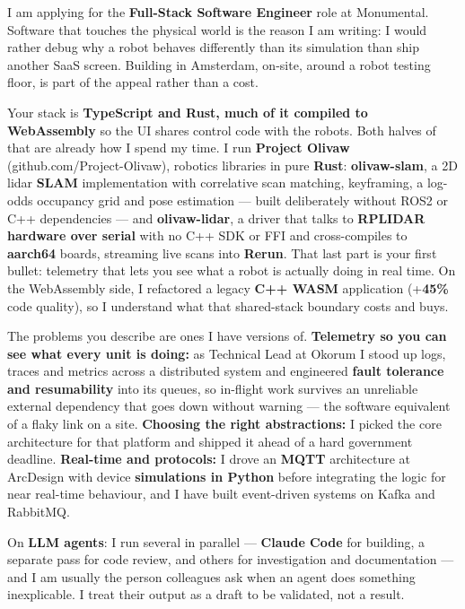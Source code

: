 \documentclass[11pt,a4paper]{awesome-cv}
\begin{document}
\makecvheader[R]
\makelettertitle

\begin{cvletter}

I am applying for the \textbf{Full-Stack Software Engineer} role at Monumental. Software that touches the physical world is the reason I am writing: I would rather debug why a robot behaves differently than its simulation than ship another SaaS screen. Building in Amsterdam, on-site, around a robot testing floor, is part of the appeal rather than a cost.

Your stack is \textbf{TypeScript and Rust, much of it compiled to WebAssembly} so the UI shares control code with the robots. Both halves of that are already how I spend my time. I run \textbf{Project Olivaw} (github.com/Project-Olivaw), robotics libraries in pure \textbf{Rust}: \textbf{olivaw-slam}, a 2D lidar \textbf{SLAM} implementation with correlative scan matching, keyframing, a log-odds occupancy grid and pose estimation --- built deliberately without ROS2 or C++ dependencies --- and \textbf{olivaw-lidar}, a driver that talks to \textbf{RPLIDAR hardware over serial} with no C++ SDK or FFI and cross-compiles to \textbf{aarch64} boards, streaming live scans into \textbf{Rerun}. That last part is your first bullet: telemetry that lets you see what a robot is actually doing in real time. On the WebAssembly side, I refactored a legacy \textbf{C++ WASM} application (+\textbf{45\%} code quality), so I understand what that shared-stack boundary costs and buys.

The problems you describe are ones I have versions of. \textbf{Telemetry so you can see what every unit is doing:} as Technical Lead at Okorum I stood up logs, traces and metrics across a distributed system and engineered \textbf{fault tolerance and resumability} into its queues, so in-flight work survives an unreliable external dependency that goes down without warning --- the software equivalent of a flaky link on a site. \textbf{Choosing the right abstractions:} I picked the core architecture for that platform and shipped it ahead of a hard government deadline. \textbf{Real-time and protocols:} I drove an \textbf{MQTT} architecture at ArcDesign with device \textbf{simulations in Python} before integrating the logic for near real-time behaviour, and I have built event-driven systems on Kafka and RabbitMQ.

On \textbf{LLM agents}: I run several in parallel --- \textbf{Claude Code} for building, a separate pass for code review, and others for investigation and documentation --- and I am usually the person colleagues ask when an agent does something inexplicable. I treat their output as a draft to be validated, not a result.


\end{cvletter}
\end{document}

